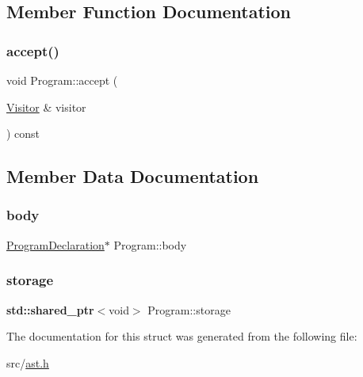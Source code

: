 \subsection{Member Function Documentation}
\mbox{\label{struct_program_afbd3eb6a94760e56c25492ea1dc685ed}} 
\subsubsection{\texorpdfstring{accept()}{accept()}}
{\footnotesize\ttfamily void Program\+::accept (\begin{DoxyParamCaption}\item[{\hyperlink{struct_visitor}{Visitor} \&}]{visitor }\end{DoxyParamCaption}) const\hspace{0.3cm}{\ttfamily [inline]}}



\subsection{Member Data Documentation}
\mbox{\label{struct_program_aac5fe6649a517713e596e4ad5f45e4a4}} 
\subsubsection{\texorpdfstring{body}{body}}
{\footnotesize\ttfamily \hyperlink{struct_program_declaration}{Program\+Declaration}$\ast$ Program\+::body}

\mbox{\label{struct_program_aa25d5746067ab06823bf867e89dc8785}} 
\subsubsection{\texorpdfstring{storage}{storage}}
{\footnotesize\ttfamily \textbf{ std\+::shared\+\_\+ptr}$<$void$>$ Program\+::storage}



The documentation for this struct was generated from the following file\+:\begin{DoxyCompactItemize}
\item 
src/\hyperlink{ast_8h}{ast.\+h}\end{DoxyCompactItemize}
